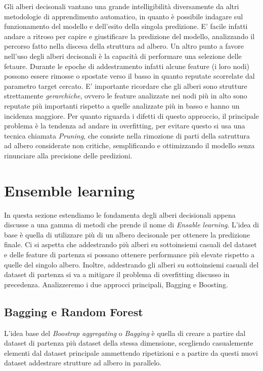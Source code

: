 \documentclass[12pt,a4paper,openright,twoside]{report}
\begin{document}
Gli alberi decisonali vantano una grande intelligibilità diversamente da altri metodologie di apprendimento automatico, in quanto è possibile indagare sul funzionamento del modello e dell'esito della singola predizione. E' facile infatti andare a ritroso per capire e giustificare la predizione del modello, analizzando il percorso fatto nella discesa della struttura ad albero. 
Un altro punto a favore nell'uso degli alberi decisonali è la capacità di performare una selezione delle fetaure. Durante le epoche di addestramento infatti alcune feature (i loro nodi) possono essere rimosse o spostate verso il basso in quanto reputate scorrelate dal parametro target cercato. 
E' importante ricordare che gli alberi sono strutture strettamente \emph{gerarchiche}, ovvero le feature analizzate nei nodi più in alto sono reputate più importanti rispetto a quelle analizzate più in basso e hanno un incidenza maggiore.
Per quanto riguarda i difetti di questo approccio, il principale problema è la tendenza ad andare in overfitting, per evitare questo si usa una tecnica chiamata \emph{Pruning}, che consiste nella rimozione di parti della satruttura ad albero considerate non critiche, semplificando e ottimizzando il modello senza rinunciare alla precisione delle predizioni. 
\section{Ensemble learning}
In questa sezione estendiamo le fondamenta degli alberi decisionali appena discusse a una gamma di metodi che prende il nome di \emph{Ensable learning}.
L'idea di base è quella di utilizzare più di un albero decisonale per ottenere la predizione finale. Ci si aspetta che addestrando più alberi su sottoinsiemi casuali del dataset e delle feature di partenza si possano ottenere performance più elevate rispetto a quelle del singolo albero. Inoltre, addestrando gli alberi su sottoinsiemi casuali del dataset di partenza si va a mitigare il problema di overfitting discusso in precedenza.
Analizzeremo i due approcci principali, Bagging e Boosting.
\subsection{Bagging e Random Forest}
L'idea base del \emph{Boostrap aggregating} o \emph{Bagging} è quella di creare a partire dal dataset di partenza più dataset della stessa dimensione, scegliendo casualemente elementi dal dataset principale ammettendo ripetizioni e a partire da questi nuovi dataset addestrare strutture ad albero in parallelo. 
\end{document}
